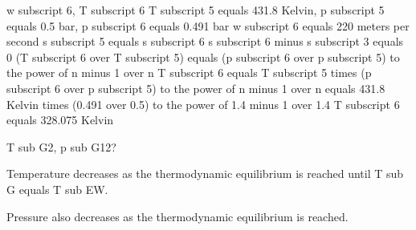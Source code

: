 w subscript 6, T subscript 6  
T subscript 5 equals 431.8 Kelvin, p subscript 5 equals 0.5 bar, p subscript 6 equals 0.491 bar  
w subscript 6 equals 220 meters per second  
s subscript 5 equals s subscript 6  
s subscript 6 minus s subscript 3 equals 0  
(T subscript 6 over T subscript 5) equals (p subscript 6 over p subscript 5) to the power of n minus 1 over n  
T subscript 6 equals T subscript 5 times (p subscript 6 over p subscript 5) to the power of n minus 1 over n equals 431.8 Kelvin times (0.491 over 0.5) to the power of 1.4 minus 1 over 1.4  
T subscript 6 equals 328.075 Kelvin

T sub G2, p sub G12?

Temperature decreases as the thermodynamic equilibrium is reached until T sub G equals T sub EW.

Pressure also decreases as the thermodynamic equilibrium is reached.
